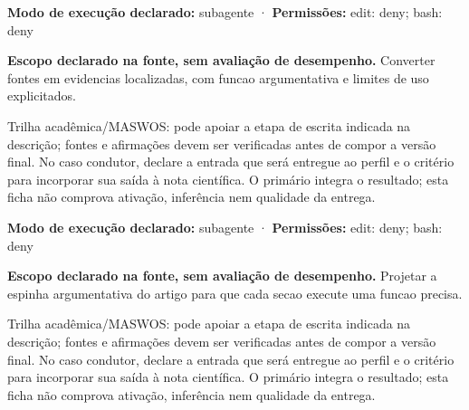 \begin{arquitetura}
\textbf{Modo de execução declarado:} subagente · \textbf{Permissões:} edit: deny; bash: deny
\end{arquitetura}


\begin{descricao}
\textbf{Escopo declarado na fonte, sem avaliação de desempenho.}
Converter fontes em evidencias localizadas, com funcao argumentativa e limites de uso explicitados.
\end{descricao}

\begin{funcao}
Trilha acadêmica/MASWOS: pode apoiar a etapa de escrita indicada na descrição; fontes e afirmações devem ser verificadas antes de compor a versão final. No caso condutor, declare a entrada que será entregue ao perfil e o critério para incorporar sua saída à nota científica. O primário integra o resultado; esta ficha não comprova ativação, inferência nem qualidade da entrega.
\end{funcao}

\begin{arquitetura}
\textbf{Modo de execução declarado:} subagente · \textbf{Permissões:} edit: deny; bash: deny
\end{arquitetura}


\begin{descricao}
\textbf{Escopo declarado na fonte, sem avaliação de desempenho.}
Projetar a espinha argumentativa do artigo para que cada secao execute uma funcao precisa.
\end{descricao}

\begin{funcao}
Trilha acadêmica/MASWOS: pode apoiar a etapa de escrita indicada na descrição; fontes e afirmações devem ser verificadas antes de compor a versão final. No caso condutor, declare a entrada que será entregue ao perfil e o critério para incorporar sua saída à nota científica. O primário integra o resultado; esta ficha não comprova ativação, inferência nem qualidade da entrega.
\end{funcao}


